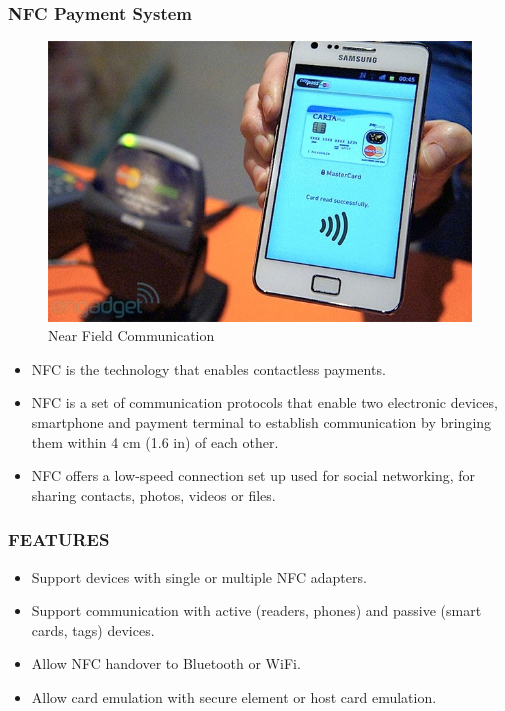 \documentclass[handout]{beamer}
\begin{document}
\begin{frame}
\frametitle{NFC Payment System}
\begin{figure}[h]
\begin{center}
\includegraphics[scale=0.2,angle=360]{nfc1.jpg}
\caption{Near Field Communication}
\end{center}
\end{figure}







\begin{itemize}
\item NFC is the technology that enables contactless payments.
\item NFC is a set of communication protocols that enable two electronic devices, smartphone and payment terminal to establish communication by bringing them within 4 cm (1.6 in) of each other.
\item NFC offers a low-speed connection set up used for social networking, for sharing contacts, photos, videos or files.
\end{itemize}
\end{frame}
\begin{frame}
\frametitle{FEATURES}
\begin{itemize}
\item Support devices with single or multiple NFC adapters.
\item Support communication with active (readers, phones) and passive (smart cards, tags) devices.
\item Allow NFC handover to Bluetooth or WiFi.
\item Allow card emulation with secure element or host card emulation.
\end{itemize}
\end{frame}
\end{document}
